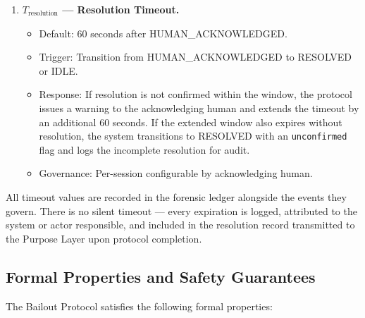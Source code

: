 \begin{enumerate}
\item \textbf{$T_{\text{resolution}}$ --- Resolution Timeout.}
\begin{itemize}
    \item Default: 60 seconds after HUMAN\_ACKNOWLEDGED.
    \item Trigger: Transition from HUMAN\_ACKNOWLEDGED to RESOLVED or IDLE.
    \item Response: If resolution is not confirmed within the window, the protocol issues a warning to the acknowledging human and extends the timeout by an additional 60 seconds. If the extended window also expires without resolution, the system transitions to RESOLVED with an \texttt{unconfirmed} flag and logs the incomplete resolution for audit.
    \item Governance: Per-session configurable by acknowledging human.
\end{itemize}

\end{enumerate}

All timeout values are recorded in the forensic ledger alongside the events they govern. There is no silent timeout --- every expiration is logged, attributed to the system or actor responsible, and included in the resolution record transmitted to the Purpose Layer upon protocol completion.

\subsection{Formal Properties and Safety Guarantees}

The Bailout Protocol satisfies the following formal properties:

